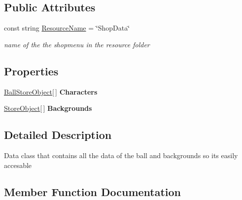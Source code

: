 \subsection*{Public Attributes}
\begin{DoxyCompactItemize}
\item 
const string \hyperlink{class_menus_1_1_shop_menu_data_a0f1c9a23c1e5da1011eacc742121334a}{Resource\+Name} = \char`\"{}Shop\+Data\char`\"{}
\begin{DoxyCompactList}\small\item\em name of the the shopmenu in the resource folder \end{DoxyCompactList}\end{DoxyCompactItemize}
\subsection*{Properties}
\begin{DoxyCompactItemize}
\item 
\hyperlink{class_menus_1_1_shop_menu_data_1_1_ball_store_object}{Ball\+Store\+Object}\mbox{[}$\,$\mbox{]} {\bfseries Characters}\hypertarget{class_menus_1_1_shop_menu_data_a77f05492a6e757df9f184c076c3c2a8f}{}\label{class_menus_1_1_shop_menu_data_a77f05492a6e757df9f184c076c3c2a8f}

\item 
\hyperlink{class_menus_1_1_shop_menu_data_1_1_store_object}{Store\+Object}\mbox{[}$\,$\mbox{]} {\bfseries Backgrounds}\hypertarget{class_menus_1_1_shop_menu_data_a7736493b49a50ab592f5772933fa0ce9}{}\label{class_menus_1_1_shop_menu_data_a7736493b49a50ab592f5772933fa0ce9}

\end{DoxyCompactItemize}


\subsection{Detailed Description}
Data class that contains all the data of the ball and backgrounds so it\textquotesingle{}s easily accesable 



\subsection{Member Function Documentation}
